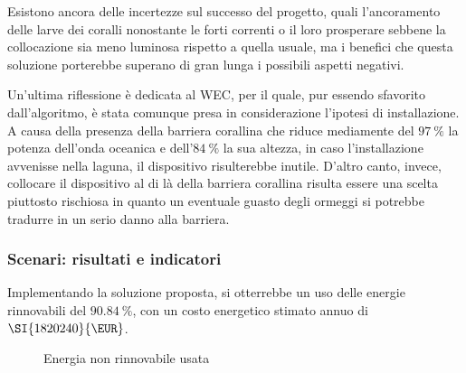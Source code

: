Esistono ancora delle incertezze sul successo del progetto, quali l'ancoramento delle larve dei coralli nonostante le forti correnti o il loro prosperare sebbene la collocazione sia meno luminosa rispetto a quella usuale, ma i benefici che questa soluzione porterebbe superano di gran lunga i possibili aspetti negativi.

Un'ultima riflessione è dedicata al WEC, per il quale, pur essendo sfavorito dall'algoritmo, è stata comunque presa in considerazione l'ipotesi di installazione. 
A causa della presenza della barriera corallina che riduce mediamente del \(\SI{97}{\percent}\) la potenza dell'onda oceanica e dell'\(\SI{84}{\percent}\) la sua altezza, in caso l'installazione avvenisse nella laguna, il dispositivo risulterebbe inutile. 
D'altro canto, invece, collocare il dispositivo al di là della barriera corallina risulta essere una scelta piuttosto rischiosa in quanto un eventuale guasto degli ormeggi si potrebbe tradurre in un serio danno alla barriera.

\subsubsection{Scenari: risultati e indicatori}
Implementando la soluzione proposta, si otterrebbe un uso delle energie rinnovabili del \(\SI{90.84}{\percent}\), con un costo energetico stimato annuo di \(\SI{1820240}{\EUR}\). \\
\begin{figure}[ht]\centering
	\caption{Energia non rinnovabile usata}
	\label{fig:not_fer}
\end{figure}

